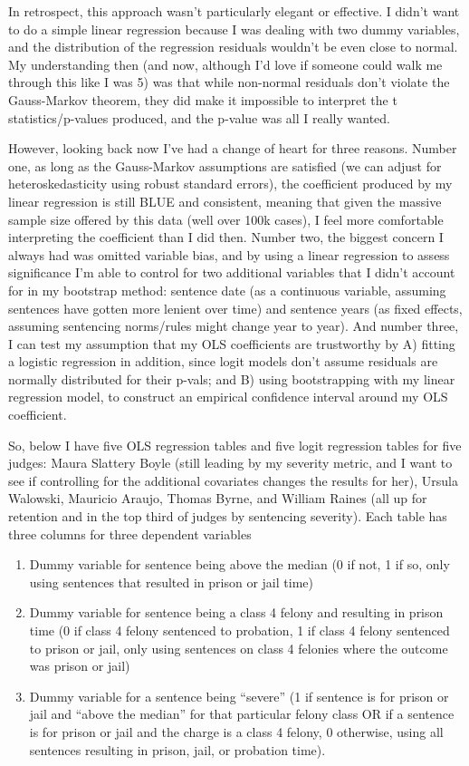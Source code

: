\documentclass[
]{article}
\providecommand{\tightlist}{%
  \setlength{\itemsep}{0pt}\setlength{\parskip}{0pt}}
\begin{document}
In retrospect, this approach wasn't particularly elegant or effective. I
didn't want to do a simple linear regression because I was dealing with
two dummy variables, and the distribution of the regression residuals
wouldn't be even close to normal. My understanding then (and now,
although I'd love if someone could walk me through this like I was 5)
was that while non-normal residuals don't violate the Gauss-Markov
theorem, they did make it impossible to interpret the t
statistics/p-values produced, and the p-value was all I really wanted.

However, looking back now I've had a change of heart for three reasons.
Number one, as long as the Gauss-Markov assumptions are satisfied (we
can adjust for heteroskedasticity using robust standard errors), the
coefficient produced by my linear regression is still BLUE and
consistent, meaning that given the massive sample size offered by this
data (well over 100k cases), I feel more comfortable interpreting the
coefficient than I did then. Number two, the biggest concern I always
had was omitted variable bias, and by using a linear regression to
assess significance I'm able to control for two additional variables
that I didn't account for in my bootstrap method: sentence date (as a
continuous variable, assuming sentences have gotten more lenient over
time) and sentence years (as fixed effects, assuming sentencing
norms/rules might change year to year). And number three, I can test my
assumption that my OLS coefficients are trustworthy by A) fitting a
logistic regression in addition, since logit models don't assume
residuals are normally distributed for their p-vals; and B) using
bootstrapping with my linear regression model, to construct an empirical
confidence interval around my OLS coefficient.

So, below I have five OLS regression tables and five logit regression
tables for five judges: Maura Slattery Boyle (still leading by my
severity metric, and I want to see if controlling for the additional
covariates changes the results for her), Ursula Walowski, Mauricio
Araujo, Thomas Byrne, and William Raines (all up for retention and in
the top third of judges by sentencing severity). Each table has three
columns for three dependent variables

\begin{enumerate}
\def\labelenumi{\arabic{enumi}.}
\tightlist
\item
  Dummy variable for sentence being above the median (0 if not, 1 if so,
  only using sentences that resulted in prison or jail time)
\item
  Dummy variable for sentence being a class 4 felony and resulting in
  prison time (0 if class 4 felony sentenced to probation, 1 if class 4
  felony sentenced to prison or jail, only using sentences on class 4
  felonies where the outcome was prison or jail)
\item
  Dummy variable for a sentence being ``severe'' (1 if sentence is for
  prison or jail and ``above the median'' for that particular felony
  class OR if a sentence is for prison or jail and the charge is a class
  4 felony, 0 otherwise, using all sentences resulting in prison, jail,
  or probation time).
\end{enumerate}
\end{document}
